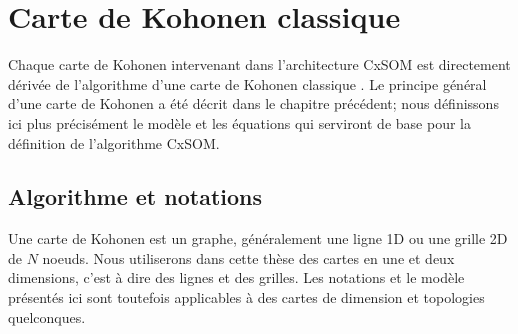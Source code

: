 \section{Carte de Kohonen classique}\label{sec:kohonen}
Chaque carte de Kohonen intervenant dans l'architecture CxSOM est directement dérivée de l'algorithme d'une carte de Kohonen classique \cite{kohonen92}. Le principe général d'une carte de Kohonen a été décrit dans le chapitre précédent; nous définissons ici plus précisément le modèle et les équations qui serviront de base pour la définition de l'algorithme CxSOM.

\subsection{Algorithme et notations}
Une carte de Kohonen est un graphe, généralement une ligne 1D ou une grille 2D de $N$ noeuds. Nous utiliserons dans cette thèse des cartes en une et deux dimensions, c'est à dire des lignes et des grilles. Les notations et le modèle présentés ici sont toutefois applicables à des cartes de dimension et topologies quelconques.

